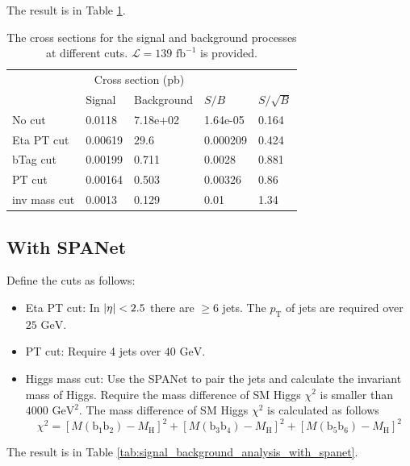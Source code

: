 \documentclass[12pt]{article}
\begin{document}
	The result is in Table \ref{tab:signal_background_analysis}.

	\begin{table}[htpb]
		\centering
		\caption{The cross sections for the signal and background processes at different cuts. $\mathcal{L} = 139 \text{ fb}^{-1}$ is provided.}
		\label{tab:signal_background_analysis}
		\begin{tabular}{l|ll|ll}
						 & \multicolumn{2}{|c|}{Cross section (pb)} &            &             \\
						 & Signal          & Background      & $S / B$        & $S / \sqrt{B}$ \\
			\hline 	
			No cut       & 0.0118         & 7.18e+02         & 1.64e-05 & 0.164       \\
			Eta PT cut   & 0.00619        & 29.6             & 0.000209 & 0.424       \\
			bTag cut     & 0.00199        & 0.711            & 0.0028   & 0.881       \\
			PT cut       & 0.00164        & 0.503            & 0.00326  & 0.86        \\
			inv mass cut & 0.0013         & 0.129            & 0.01     & 1.34       
		\end{tabular}
	\end{table}


	\subsection{With SPANet}%
	\label{sub:with_spanet}
		Define the cuts as follows:
		\begin{itemize}
			\item Eta PT cut: In $\abs{\eta} < 2.5$ there are $\ge 6$ jets. The $p_\text{T}$ of jets are required over $25 \text{ GeV}$.
			\item PT cut: Require 4 jets over $40 \text{ GeV}$.
			\item Higgs mass cut: Use the SPANet to pair the jets and calculate the invariant mass of Higgs. Require the mass difference of SM Higgs $\chi^2$ is smaller than $4000  \text{ GeV}^2$. The mass difference of SM Higgs $\chi^2$ is calculated as follows
			\[
				\chi^2 = [M(\text{b}_1\text{b}_2) - M_\text{H}]^2 + [M(\text{b}_3\text{b}_4) - M_\text{H}]^2 +[M(\text{b}_5\text{b}_6) - M_\text{H}]^2
			\] 
		\end{itemize}

		The result is in Table \ref{tab:signal_background_analysis_with_spanet}.
\end{document}
